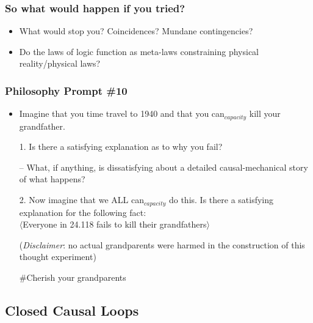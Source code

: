\begin{frame}
\frametitle{So what would happen if you tried?}

\begin{itemize}[<+->]

\item What would stop you? Coincidences? Mundane contingencies?

\item Do the laws of logic function as meta-laws constraining physical reality/physical laws?

\end{itemize}
\end{frame}

\begin{frame}
\frametitle{Philosophy Prompt \#10}

\begin{itemize}[<+->]

\item Imagine that you time travel to 1940 and that you can$_{capacity}$ kill your grandfather.

\item[1.] Is there a satisfying explanation as to why you fail? 

\item[] -- What, if anything, is dissatisfying about a detailed causal-mechanical story of what happens? 

\item[2.] Now imagine that we ALL can$_{capacity}$ do this. Is there a satisfying explanation for the following fact: \\ $\langle$Everyone in 24.118 fails to kill their grandfathers$\rangle$


\item[] (\textit{Disclaimer}: no actual grandparents were harmed in the construction of this thought experiment)
\item[] \#Cherish your grandparents

\end{itemize}
\end{frame}

\subsection{Closed Causal Loops}

